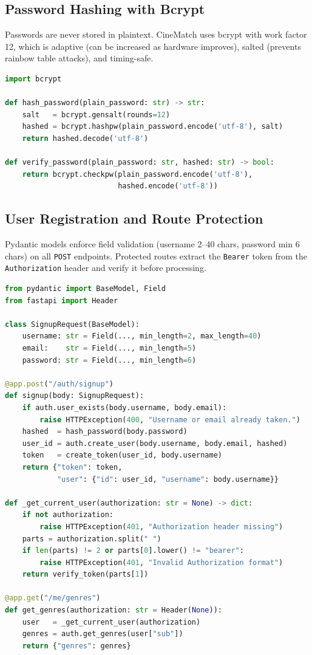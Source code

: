 \documentclass[12pt,a4paper]{report}
\begin{document}
\subsection{Password Hashing with Bcrypt}

Passwords are never stored in plaintext. CineMatch uses bcrypt with work factor 12, which is adaptive (can be increased as hardware improves), salted (prevents rainbow table attacks), and timing-safe.

\begin{lstlisting}[language=Python, caption={Bcrypt Password Hashing}]
import bcrypt

def hash_password(plain_password: str) -> str:
    salt   = bcrypt.gensalt(rounds=12)
    hashed = bcrypt.hashpw(plain_password.encode('utf-8'), salt)
    return hashed.decode('utf-8')

def verify_password(plain_password: str, hashed: str) -> bool:
    return bcrypt.checkpw(plain_password.encode('utf-8'),
                          hashed.encode('utf-8'))
\end{lstlisting}

\subsection{User Registration and Route Protection}

Pydantic models enforce field validation (username 2--40 chars, password min 6 chars) on all \texttt{POST} endpoints. Protected routes extract the \texttt{Bearer} token from the \texttt{Authorization} header and verify it before processing.

\begin{lstlisting}[language=Python, caption={Secure User Registration and Protected Route}]
from pydantic import BaseModel, Field
from fastapi import Header

class SignupRequest(BaseModel):
    username: str = Field(..., min_length=2, max_length=40)
    email:    str = Field(..., min_length=5)
    password: str = Field(..., min_length=6)

@app.post("/auth/signup")
def signup(body: SignupRequest):
    if auth.user_exists(body.username, body.email):
        raise HTTPException(400, "Username or email already taken.")
    hashed  = hash_password(body.password)
    user_id = auth.create_user(body.username, body.email, hashed)
    token   = create_token(user_id, body.username)
    return {"token": token,
            "user": {"id": user_id, "username": body.username}}

def _get_current_user(authorization: str = None) -> dict:
    if not authorization:
        raise HTTPException(401, "Authorization header missing")
    parts = authorization.split(" ")
    if len(parts) != 2 or parts[0].lower() != "bearer":
        raise HTTPException(401, "Invalid Authorization format")
    return verify_token(parts[1])

@app.get("/me/genres")
def get_genres(authorization: str = Header(None)):
    user   = _get_current_user(authorization)
    genres = auth.get_genres(user["sub"])
    return {"genres": genres}
\end{lstlisting}
\end{document}
